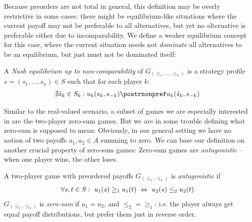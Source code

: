 \documentclass[a4paper]{scrreprt}
\begin{document}
    Because preorders are not total in general, this definition may be overly restrictive in some cases: there might be equilibrium-like situations where the current payoff may not be preferable to all alternatives, but yet no alternative is preferable either due to incomparability. We define a weaker equilibrium concept for this case, where the current situation needs not \emph{dominate} all alternatives to be an equilibrium, but just must not be dominated itself:
    \begin{defn}
        A \emph{Nash equilibrium up to non-comparability} of $G_{(\leq_1, \dots, \leq_n)}$
        is a strategy profile $s = (s_1, \dots, s_n) \in S$ such that for each player $k$:
        \begin{gather}
            \nexists \tilde{s}_k \in S_k: u_k(s_k, s_{-k}) \postrnonpref u_k(\tilde{s}_k, s_{-k})
        \end{gather}
    \end{defn}
    
    Similar to the real-valued scenario, a subset of games we are especially interested in are the two-player zero-sum games.
    But we are in some trouble defining what zero-sum is supposed to mean: Obviously, in our general setting we have no notion of two payoffs $a_1, a_2 \in A$ summing to zero.
    We can base our definition on another crucial property of zero-sum games: Zero-sum games are \emph{antagonistic} -- when one player wins, the other loses.
    
    \begin{defn}
        A two-player game with preordered payoffs $G_{(\leq_1, \leq_2)}$ is \emph{antagonistic} if
        \begin{gather*}
            \forall s, t \in S:~ u_1(s) \geq_1 u_1(t) ~\Leftrightarrow~ u_2(s) \leq_2 u_2(t)
        \end{gather*}
        $G_{(\leq_1, \leq_2)}$ is \emph{zero-sum} if $u_1 = u_2$, and $\leq_2 {=} \geq_1$: i.e. the player always get equal payoff distributions, but prefer them just in reverse order.
        \label{def:zeroSumPreorderedPayoffs}
    \end{defn}
    
\end{document}
